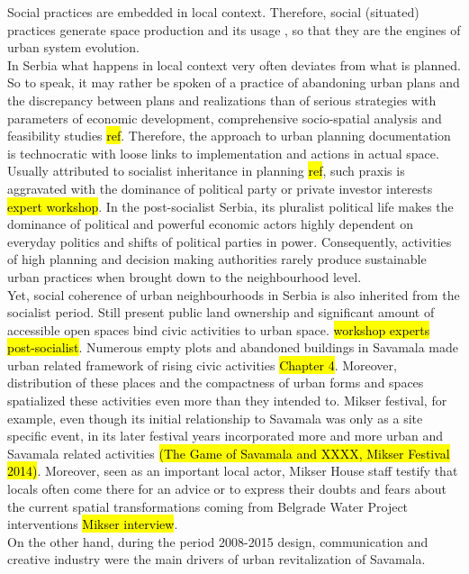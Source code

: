 \documentclass[11pt]{report}
\begin{document}
Social practices are embedded in local context. Therefore, social (situated) practices generate space production and its usage \cite{Holanda 2011}, so that they are the engines of urban system evolution. %
\\
In Serbia what happens in local context very often deviates from what is planned. So to speak, it may rather be spoken of a practice of abandoning urban plans and the discrepancy between plans and realizations than of serious strategies with parameters of economic development, comprehensive socio-spatial analysis and feasibility studies \hl{ref}.
Therefore, the approach to urban planning documentation is technocratic with loose links to implementation and actions in actual space.
Usually attributed to socialist inheritance in planning \hl{ref}, such praxis is aggravated with the dominance of political party or private investor interests \hl{expert workshop}. In the post-socialist Serbia, its pluralist political life makes the dominance of political and powerful economic actors highly dependent on everyday politics and shifts of political parties in power.
Consequently, activities of high planning and decision making authorities rarely produce sustainable urban practices when brought down to the neighbourhood level.
\\
Yet, social coherence of urban neighbourhoods in Serbia is also inherited from the socialist period.
Still present public land ownership and significant amount of accessible open spaces bind civic activities to urban space. \hl{workshop experts post-socialist}. 
Numerous empty plots and abandoned buildings in Savamala made urban related framework of rising civic activities \hl{Chapter 4}. Moreover, distribution of these places and the compactness of urban forms and spaces spatialized these activities even more than they intended to.
Mikser festival, for example, even though its initial relationship to Savamala was only as a site specific event, in its later festival years incorporated more and more urban and Savamala related activities \hl{(The Game of Savamala and XXXX, Mikser Festival 2014)}. Moreover, seen as an important local actor, Mikser House staff testify that locals often come there for an advice or to express their doubts and fears about the current spatial transformations coming from Belgrade Water Project interventions \hl{Mikser interview}.
\\
On the other hand, during the period 2008-2015 design, communication and creative industry were the main drivers of urban revitalization of Savamala.
\end{document}
